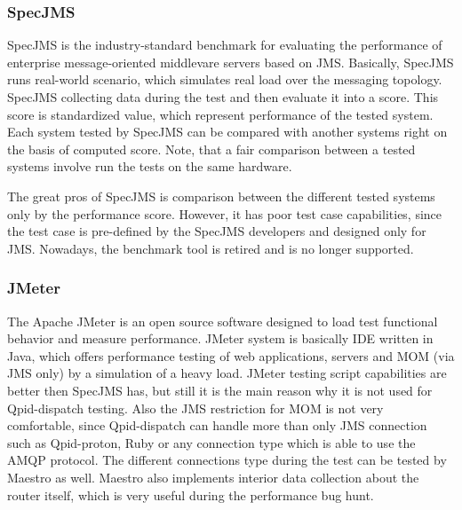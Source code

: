 \subsubsection*{SpecJMS}
SpecJMS is the industry-standard benchmark for evaluating the performance of enterprise message-oriented middlevare servers based on JMS. Basically, SpecJMS runs real-world scenario, which simulates real load over the messaging topology. SpecJMS collecting data during the test and then evaluate it into a score. This score is standardized value, which represent performance of the tested system. Each system tested by SpecJMS can be compared with another systems right on the basis of computed score. Note, that a fair comparison between a tested systems involve run the tests on the same hardware.

The great pros of SpecJMS is comparison between the different tested systems only by the performance score. However, it has poor test case capabilities, since the test case is pre-defined by the SpecJMS developers and designed only for JMS. Nowadays, the benchmark tool is retired and is no longer supported.

\subsubsection*{JMeter}
The Apache JMeter is an open source software designed to load test functional behavior and measure performance. JMeter system is basically IDE written in Java, which offers performance testing of web applications, servers and MOM (via JMS only) by a simulation of a heavy load. JMeter testing script capabilities are better then SpecJMS has, but still it is the main reason why it is not used for Qpid-dispatch testing. Also the JMS restriction for MOM is not very comfortable, since Qpid-dispatch can handle more than only JMS connection such as Qpid-proton, Ruby or any connection type which is able to use the AMQP protocol. The different connections type during the test can be tested by Maestro as well. Maestro also implements interior data collection about the router itself, which is very useful during the performance bug hunt.
